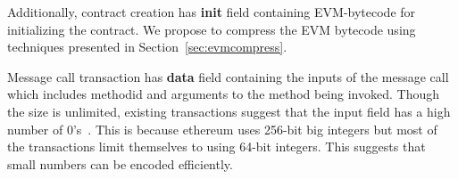 Additionally, contract creation has \textbf{init} field containing EVM-bytecode for initializing the contract.
We propose to compress the EVM bytecode using techniques presented in Section~\ref{sec:evmcompress}. 

Message call transaction has \textbf{data} field containing the inputs of the message call which includes methodid and arguments to the method being invoked.
Though the size is unlimited, existing transactions suggest that the input field has a high number of 0's~\cite{ethtx}. 
This is because ethereum uses 256-bit big integers but most of the transactions limit themselves to using 64-bit integers. 
This suggests that small numbers can be encoded efficiently.


%

